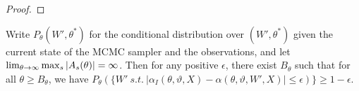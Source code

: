 \begin{proof}

\end{proof}
\begin{proposition}
  Write $P_{\theta}(W',\theta^*)$ for the conditional distribution 
  over $(W',\theta^*)$ given the current state of the MCMC sampler and the 
  observations, and let
  $\lim_{\theta\rightarrow\infty} {\max_s |A_s(\theta)|} = \infty$. Then for any positive 
  $\epsilon$, there exist $B_\theta$ such that for all 
  $\theta \ge B_\theta$, %
  we have 
  $P_{\theta}(\{W'\ s.t.\ |\alpha_I(\theta,\vartheta,X) - \alpha(\theta,\vartheta,W',X)| 
  \le \epsilon)\} \ge 1-\epsilon$.%
\label{prop:mix}
\end{proposition}
